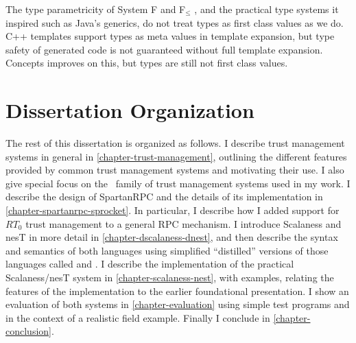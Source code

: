 The type parametricity of System F and F$_\le$ \cite{Cardelli-1985}, and the practical type
systems it inspired such as Java's generics, do not treat types as first class values as we do.
C++ templates support types as meta values in template expansion, but type safety of generated
code is not guaranteed without full template expansion. Concepts \cite{gregor06:_concepts}
improves on this, but types are still not first class values.

\section{Dissertation Organization}

The rest of this dissertation is organized as follows. I describe trust management systems in
general in \autoref{chapter-trust-management}, outlining the different features provided by
common trust management systems and motivating their use. I also give special focus on the \RT\
family of trust management systems used in my work. I describe the design of SpartanRPC and the
details of its implementation in \autoref{chapter-spartanrpc-sprocket}. In particular, I
describe how I added support for $RT_0$ trust management to a general RPC mechanism. I introduce
Scalaness and nesT in more detail in \autoref{chapter-dscalaness-dnest}, and then describe the
syntax and semantics of both languages using simplified ``distilled'' versions of those
languages called \newterm{DScalaness} and \newterm{DnesT}. I describe the implementation of the
practical Scalaness/nesT system in \autoref{chapter-scalaness-nest}, with examples, relating the
features of the implementation to the earlier foundational presentation. I show an evaluation of
both systems in \autoref{chapter-evaluation} using simple test programs and in the context of a
realistic field example. Finally I conclude in \autoref{chapter-conclusion}.


